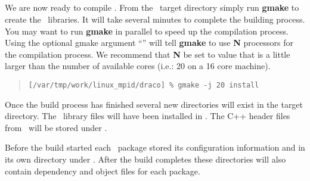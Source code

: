 \subsection{\draco}





We are now ready to compile \draco.  From the \draco\ target directory
simply run \textbf{gmake} to create the \draco\ libraries.  It will
take several minutes to complete the building process.  You may want
to run \textbf{gmake} in parallel to speed up the compilation
process.  Using the optional gmake argument ``'' will tell
\textbf{gmake} to use \textbf{N} processors for the compilation
process.  We recommend that \textbf{N} be set to value that is a
little larger than the number of available cores (i.e.: 20 on a 16
core machine).

\footnotesize
\begin{verse}
\texttt{[/var/tmp/work/linux\_mpid/draco] \% gmake -j 20 install}
\end{verse}
\normalsize

Once the build process has finished several new directories will exist
in the target directory.  The \draco\ library files will have been
installed in .  The C++ header
files from \draco\ will be stored under
.

Before the build started each \draco\ package stored its configuration
information and  in its own directory under
.  After the build completes
these directories will also contain dependency and object files for
each package.

